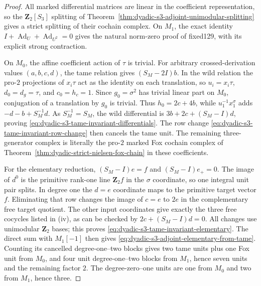 \documentclass[11pt]{article}
\theoremstyle{definition}
\begin{document}
\begin{proof}
All marked differential matrices
are linear in the coefficient
representation, so the
$\mathbf Z_2[S_3]$ splitting
of Theorem~\ref{thm:dyadic-s3-adjoint-unimodular-splitting}
gives a strict splitting of
their cochain complex.
On $M_1$, the exact identity
$I+\operatorname{Ad}_U+
\operatorname{Ad}_{U^2}=0$
gives the natural norm-zero
proof of fixed129, with its
explicit strong contraction.

On $M_0$, the affine coefficient
action of $\tau$ is trivial.
For arbitrary crossed-derivation
values $(a,b,c,d)$,
the tame relation gives
$(S_M-2I)b$.  In the wild
relation the pro-$2$ projections
of $x_i\tau$ act as the identity
on each translation, so
$u_i=x_i\tau$,
$d_0=d_g=\tau$, and
$c_0=h_c=1$.  Since
$g_0=\sigma^2$ has trivial
linear part on $M_0$,
conjugation of a translation
by $g_0$ is trivial.
Thus
$h_0=2c+4b$,
while $u_1^{-1}x_1^\sigma$
adds $-d-b+S_M^{-1}d$.
As $S_M^{-1}=S_M$,
the wild differential is
$3b+2c+(S_M-I)d$,
proving
\eqref{eq:dyadic-s3-tame-invariant-differentials}.
The row change
\eqref{eq:dyadic-s3-tame-invariant-row-change}
then cancels the tame unit.
The remaining three-generator
complex is literally the
pro-$2$ marked Fox cochain
complex of
Theorem~\ref{thm:dyadic-strict-nielsen-fox-chain}
in these coefficients.

For the elementary reduction,
$(S_M-I)e=f$ and
$(S_M-I)e_+=0$.
The image of $d^0$ is the
primitive rank-one line
$\mathbf Z_2 f$ in the
$\sigma$ coordinate, so
one integral unit pair splits.
In degree one the $d=e$
coordinate maps to the
primitive target vector $f$.
Eliminating that row changes
the image of $c=e$ to
$2e$ in the complementary
free target quotient.
The other input coordinates
give exactly the three free
cocycles listed in (iv),
as can be checked by
$2c+(S_M-I)d=0$.
All changes use unimodular
$\mathbf Z_2$ bases; this
proves
\eqref{eq:dyadic-s3-tame-invariant-elementary}.
The direct sum with $M_1[-1]$
then gives
\eqref{eq:dyadic-s3-adjoint-elementary-from-tame}.
Counting its cancelled
degree-one--two blocks gives
two tame units plus one
Fox unit from $M_0$, and
four unit degree-one--two
blocks from $M_1$, hence
seven units and the
remaining factor $2$.
The degree-zero--one units
are one from $M_0$ and
two from $M_1$, hence three.
\end{proof}
\end{document}
